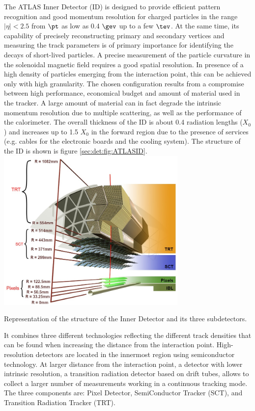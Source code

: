 The ATLAS Inner Detector (ID) \cite{ATLASTDR1} is designed to provide efficient pattern recognition and good momentum resolution for charged particles in the range $|\eta|<2.5$ from $\pt$ as low as 0.4 $\gev$ up to a few $\tev$. At the same time, its capability of precisely reconstructing primary and secondary vertices and measuring the track parameters is of primary importance for identifying the decays of short-lived particles. A precise measurement of the particle curvature in the solenoidal magnetic field requires a good spatial resolution. In presence of a high density of particles emerging from the interaction point, this can be achieved only with high granularity. The chosen configuration results from a compromise between high performance, economical budget and amount of material used in the tracker. A large amount of material can in fact degrade the intrinsic momentum resolution due to multiple scattering, as well as the performance of the calorimeter. The overall thickness of the ID is about 0.4 radiation lengths ($X_{0}$) and increases up to 1.5 $X_{0}$ in the forward region due to the presence of services (e.g. cables for the electronic boards and the cooling system). The structure of the ID is shown is figure \ref{sec:det:fig:ATLASID}.
 \bfig[tb!]
\centering
\includegraphics[width=0.7\textwidth]{figures/Detector/fig_01.png}
\captionsetup{width=0.85\textwidth} \caption{\small Representation of the structure of the Inner Detector and its three subdetectors.}
\label{sec:det:fig:ATLASID}
\efig
It combines three different technologies reflecting the different track densities that can be found when increasing the distance from the interaction point. High-resolution detectors are located in the innermost region using semiconductor technology. At larger distance from the interaction point, a detector with lower intrinsic resolution, a transition radiation detector based on drift tubes, allows to collect a larger number of measurements working in a continuous tracking mode.
The three components are:
\bi
\ib Pixel Detector,
\ib SemiConductor Tracker (SCT), and
\ib Transition Radiation Tracker (TRT).
\ei
 
